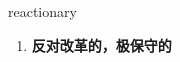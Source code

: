 
\begin{frame}
{\huge reactionary}
\begin{center}
\begin{enumerate}\Large
  \item \textbf{反对改革的，极保守的}
\end{enumerate}
\end{center}
\end{frame}

